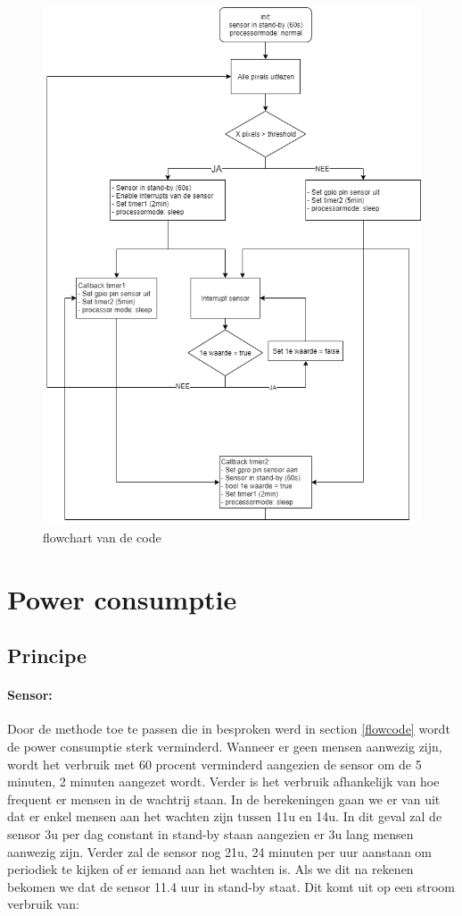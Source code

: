 \documentclass[]{article}
\begin{document}
\begin{figure}[!ht]
	\centering
	\includegraphics[scale=0.5]{flowchartcode.png}
	\caption{flowchart van de code}
	\label{fig:flowchart}
\end{figure}


\section{Power consumptie}

\subsection{Principe}
\paragraph{Sensor: }
Door de methode toe te passen die in besproken werd in section \ref{flowcode} wordt de power consumptie sterk verminderd. Wanneer er geen mensen aanwezig zijn, wordt het verbruik met 60 procent verminderd aangezien de sensor om de 5 minuten, 2 minuten aangezet wordt. Verder is het verbruik afhankelijk van hoe frequent er mensen in de wachtrij staan. In de berekeningen gaan we er van uit dat er enkel mensen aan het wachten zijn tussen 11u en 14u. In dit geval zal de sensor 3u per dag constant in stand-by staan aangezien er 3u lang mensen aanwezig zijn. Verder zal de sensor nog 21u, 24 minuten per uur aanstaan om periodiek te kijken of er iemand aan het wachten is. Als we dit na rekenen bekomen we dat de sensor 11.4 uur in stand-by staat. Dit komt uit op een stroom verbruik van: 
\end{document}
